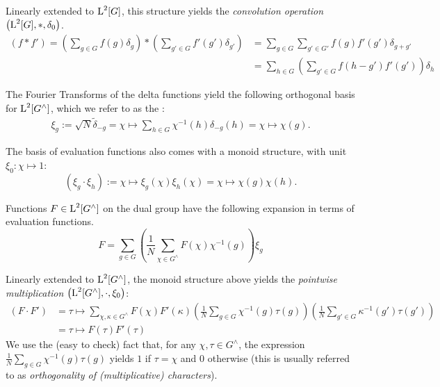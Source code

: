Linearly extended to $\operatorname{L}^2[G]$, this structure yields the \emph{convolution operation} $\left( \operatorname{L}^2[G],*,\delta_0 \right)$.
\begin{align}
\label{eqn_convolutionOperation}
\left(f * f'\right) = \left(\sum_{g\in G} f(g) \delta_g \right) * \left( \sum_{g' \in  G} f'(g') \delta_{g'} \right) &= \sum_{g\in G} \sum_{g'\in G'} f(g) f'(g') \delta_{g+g'} \\ 
&= \sum_{h\in G} \left(\sum_{g'\in G} f(h-g') f'(g')\right) \delta_h
\end{align}

The Fourier Transforms of the delta functions yield the following orthogonal basis for $\operatorname{L}^2[G^\wedge]$, which we refer to as the :
\begin{align*}
\xi_{g} := \sqrt{N}\tilde{\delta}_{-g} = \chi \mapsto \sum_{h \in G}\chi^{-1}(h)\delta_{-g}(h) = \chi \mapsto \chi(g).
\end{align*}

The basis of evaluation functions also comes with a monoid structure, with unit $\xi_0: \chi \mapsto 1$:
\begin{equation*}
  \left(\xi_g\cdot\xi_h\right):= \chi \mapsto \xi_g(\chi)\xi_h(\chi) = \chi \mapsto \chi(g)\chi(h).
\end{equation*}

Functions $F \in \operatorname{L}^2[G^\wedge]$ on the dual group have the following expansion in terms of evaluation functions.
\begin{equation*}
  F = \sum_{g\in G} \left( \frac{1}{N}\sum_{\chi \in G^\wedge} F(\chi) \chi^{-1}(g) \right) \xi_g
\end{equation*}

Linearly extended to $\operatorname{L}^2[G^\wedge]$, the monoid structure above yields the \emph{pointwise multiplication} $\left( \operatorname{L}^2[G^\wedge],\cdot,\xi_0 \right)$: 
\begin{align}
\label{eqn_PointwiseMultCharacters}
  \left(F \cdot F' \right) &= \tau \mapsto \sum_{\chi,\kappa \in G^\wedge}  F(\chi)  F'(\kappa) \left(\frac{1}{N} \sum_{g\in G} \chi^{-1}(g)\tau(g)\right) \left(\frac{1}{N} \sum_{g'\in G}\kappa^{-1}(g') \tau(g') \right) \\ &= \tau \mapsto F(\tau) F'(\tau)
\end{align}
We use the (easy to check) fact that, for any $\chi,\tau \in G^\wedge$, the expression $\frac{1}{N} \sum_{g\in G}\chi^{-1}(g) \tau(g)$ yields $1$ if $\tau = \chi$ and $0$ otherwise (this is usually referred to as \emph{orthogonality of (multiplicative) characters}).

